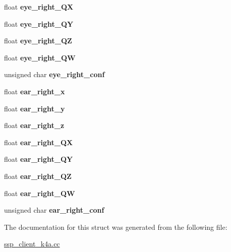 \begin{DoxyCompactItemize}
float {\bfseries eye\+\_\+right\+\_\+\+QX}
\item 
\mbox{\label{struct__custom__k4abt__body__t_a6e8725f34786b5be0e66b3becc089bbe}} 
float {\bfseries eye\+\_\+right\+\_\+\+QY}
\item 
\mbox{\label{struct__custom__k4abt__body__t_a8ddf307604cfa0b2b2747ba4a5dc5cb5}} 
float {\bfseries eye\+\_\+right\+\_\+\+QZ}
\item 
\mbox{\label{struct__custom__k4abt__body__t_a9fa427612143840f95a3d0cf07eb4ef3}} 
float {\bfseries eye\+\_\+right\+\_\+\+QW}
\item 
\mbox{\label{struct__custom__k4abt__body__t_a54bce3759b28638e07ac8c1e77cf210c}} 
unsigned char {\bfseries eye\+\_\+right\+\_\+conf}
\item 
\mbox{\label{struct__custom__k4abt__body__t_a0eb1aa67fbf8db9ff8051510fce54846}} 
float {\bfseries ear\+\_\+right\+\_\+x}
\item 
\mbox{\label{struct__custom__k4abt__body__t_a3a7ca3bf107db86fc07963691d5f3a2c}} 
float {\bfseries ear\+\_\+right\+\_\+y}
\item 
\mbox{\label{struct__custom__k4abt__body__t_a2c441ad5c200a96673f286ea95c0c54e}} 
float {\bfseries ear\+\_\+right\+\_\+z}
\item 
\mbox{\label{struct__custom__k4abt__body__t_aaf74c097703a365cbe5f5c7cd9c61a4e}} 
float {\bfseries ear\+\_\+right\+\_\+\+QX}
\item 
\mbox{\label{struct__custom__k4abt__body__t_af3b8a7f837087d8ef0b5aa27a17b5b1b}} 
float {\bfseries ear\+\_\+right\+\_\+\+QY}
\item 
\mbox{\label{struct__custom__k4abt__body__t_afeeea93b2eee7c4a87deb8a73d237cd7}} 
float {\bfseries ear\+\_\+right\+\_\+\+QZ}
\item 
\mbox{\label{struct__custom__k4abt__body__t_a733ae59e9418131494432e1df66b8fb5}} 
float {\bfseries ear\+\_\+right\+\_\+\+QW}
\item 
\mbox{\label{struct__custom__k4abt__body__t_aeeb78481d444bb4e08e1f2c29d47462f}} 
unsigned char {\bfseries ear\+\_\+right\+\_\+conf}
\end{DoxyCompactItemize}


The documentation for this struct was generated from the following file\+:\begin{DoxyCompactItemize}
\item 
\hyperlink{ssp__client__k4a_8cc}{ssp\+\_\+client\+\_\+k4a.\+cc}\end{DoxyCompactItemize}
